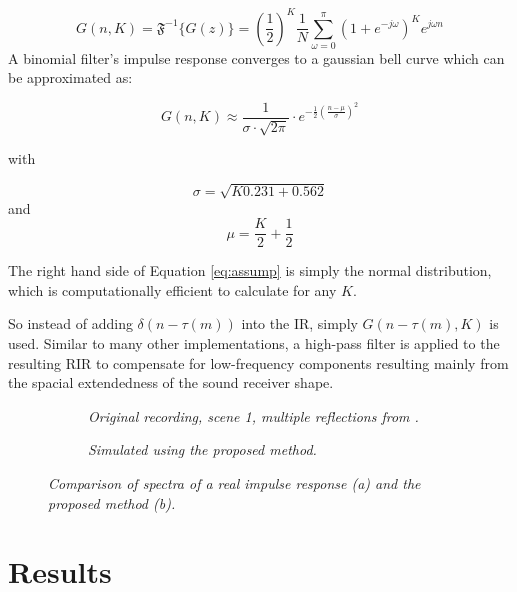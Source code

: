 \documentclass[twoside,a4paper]{article}
\begin{document}
\begin{equation}
  G(n,K) = \mathfrak{F}^{-1}\{ G(z) \} = (\frac{1}{2})^K \frac{1}{N}  \sum_{\omega = 0}^\pi (1+e^{-j\omega})^{K} e^{j\omega n} 
\end{equation}
A binomial filter's impulse response converges to a gaussian bell curve which can be approximated as:

\begin{equation}
G(n,K) \approx  \frac{1}{\sigma \cdot \sqrt{2 \pi}} \cdot e ^{-\frac{1}{2} (\frac{n-\mu}{\sigma})^2}
\label{eq:assump}
\end{equation}


with 

\begin{equation}
\sigma = \sqrt{K 0.231 + 0.562}
\end{equation}
and 
\begin{equation}
\mu = \frac{K}{2} + \frac{1}{2}
\end{equation}

The right hand side of Equation \ref{eq:assump} is simply the normal distribution, which is computationally efficient to calculate for any $K$.

So instead of adding $\delta(n-\tau(m))$ into the IR, simply $G(n-\tau(m),K)$ is used. 
Similar to many other implementations, a high-pass filter is applied to the resulting RIR to compensate for low-frequency components resulting mainly from the spacial extendedness of the sound receiver shape.



\begin{figure}[ht]
    \center
    \begin{subfigure}[t]{0.45\textwidth}
      \centering
      
    \caption{\label{fig:fig:multReflSpecOrig} \it Original recording, scene 1, multiple reflections from \cite{brinkmann_round_2019}. }
    \end{subfigure}%
    \begin{subfigure}[t]{0.45\textwidth}
      \centering
      
      \caption{\label{fig:multReflSpecSim} \it Simulated using the proposed method. }
    \end{subfigure}
    \caption{\it Comparison of spectra of a real impulse response (a) and the proposed method (b).}
    \label{fig:multReflSpecCompare}
\end{figure}


\section{Results}
\end{document}
